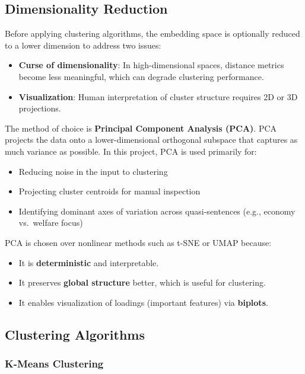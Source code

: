 \documentclass[
  letterpaper,
  DIV=11,
  numbers=noendperiod]{scrartcl}
\providecommand{\tightlist}{%
  \setlength{\itemsep}{0pt}\setlength{\parskip}{0pt}}
\begin{document}
\subsection{Dimensionality Reduction}\label{dimensionality-reduction}

Before applying clustering algorithms, the embedding space is optionally
reduced to a lower dimension to address two issues:

\begin{itemize}
\tightlist
\item
  \textbf{Curse of dimensionality}: In high-dimensional spaces, distance
  metrics become less meaningful, which can degrade clustering
  performance.
\item
  \textbf{Visualization}: Human interpretation of cluster structure
  requires 2D or 3D projections.
\end{itemize}

The method of choice is \textbf{Principal Component Analysis (PCA)}. PCA
projects the data onto a lower-dimensional orthogonal subspace that
captures as much variance as possible. In this project, PCA is used
primarily for:

\begin{itemize}
\tightlist
\item
  Reducing noise in the input to clustering
\item
  Projecting cluster centroids for manual inspection
\item
  Identifying dominant axes of variation across quasi-sentences (e.g.,
  economy vs.~welfare focus)
\end{itemize}

PCA is chosen over nonlinear methods such as t-SNE or UMAP because:

\begin{itemize}
\tightlist
\item
  It is \textbf{deterministic} and interpretable.
\item
  It preserves \textbf{global structure} better, which is useful for
  clustering.
\item
  It enables visualization of loadings (important features) via
  \textbf{biplots}.
\end{itemize}

\subsection{Clustering Algorithms}\label{clustering-algorithms}

\subsubsection{K-Means Clustering}\label{k-means-clustering}
\end{document}
